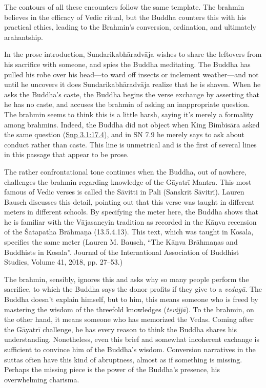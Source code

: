 \documentclass[12pt,openany]{book}%
\begin{document}
The contours of all these encounters follow the same template. The brahmin believes in the efficacy of Vedic ritual, but the Buddha counters this with his practical ethics, leading to the Brahmin’s conversion, ordination, and ultimately arahantship.

In the prose introduction, \textsanskrit{Sundarikabhāradvāja} wishes to share the leftovers from his sacrifice with someone, and spies the Buddha meditating. The Buddha has pulled his robe over his head—to ward off insects or inclement weather—and not until he uncovers it does \textsanskrit{Sundarikabhāradvāja} realize that he is shaven. When he asks the Buddha’s caste, the Buddha begins the verse exchange by asserting that he has no caste, and accuses the brahmin of asking an inappropriate question. The brahmin seems to think this is a little harsh, saying it’s merely a formality among brahmins. Indeed, the Buddha did not object when King \textsanskrit{Bimbisāra} asked the same question (\href{https://suttacentral.net/snp3.1/en/sujato\#17.4}{Snp 3.1:17.4}), and in SN 7.9 he merely says to ask about conduct rather than caste. This line is unmetrical and is the first of several lines in this passage that appear to be prose.

The rather confrontational tone continues when the Buddha, out of nowhere, challenges the brahmin regarding knowledge of the \textsanskrit{Gāyatrī} Mantra. This most famous of Vedic verses is called the \textsanskrit{Sāvitti} in Pali (Sanskrit \textsanskrit{Sāvitrī}). Lauren Bausch discusses this detail, pointing out that this verse was taught in different meters in different schools. By specifying the meter here, the Buddha shows that he is familiar with the \textsanskrit{Vājasaneyin} tradition as recorded in the \textsanskrit{Kāṇva} recension of the Śatapatha \textsanskrit{Brāhmaṇa} (13.5.4.13). This text, which was taught in Kosala, specifies the same meter (Lauren M. Bausch, “The \textsanskrit{Kāṇva} \textsanskrit{Brāhmaṇas} and Buddhists in Kosala”. Journal of the International Association of Buddhist Studies, Volume 41, 2018, pp. 27–53.) 

The brahmin, sensibly, ignores this and asks why so many people perform the sacrifice, to which the Buddha says the donor profits if they give to a \textit{\textsanskrit{vedagū}}. The Buddha doesn’t explain himself, but to him, this means someone who is freed by mastering the wisdom of the threefold knowledges (\textit{\textsanskrit{tevijjā}}). To the brahmin, on the other hand, it means someone who has memorized the Vedas. Coming after the \textsanskrit{Gāyatrī} challenge, he has every reason to think the Buddha shares his understanding. Nonetheless, even this brief and somewhat incoherent exchange is sufficient to convince him of the Buddha’s wisdom. Conversion narratives in the suttas often have this kind of abruptness, almost as if something is missing. Perhaps the missing piece is the power of the Buddha’s presence, his overwhelming charisma.
\end{document}
